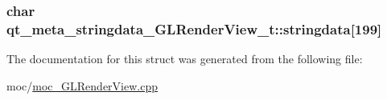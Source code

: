 \subsubsection[{stringdata}]{\setlength{\rightskip}{0pt plus 5cm}char qt\+\_\+meta\+\_\+stringdata\+\_\+\+G\+L\+Render\+View\+\_\+t\+::stringdata\mbox{[}199\mbox{]}}\label{structqt__meta__stringdata__GLRenderView__t_ac7c0a1454bc91573ef78b022640f71a4}


The documentation for this struct was generated from the following file\+:\begin{DoxyCompactItemize}
\item 
moc/\hyperlink{moc__GLRenderView_8cpp}{moc\+\_\+\+G\+L\+Render\+View.\+cpp}\end{DoxyCompactItemize}
